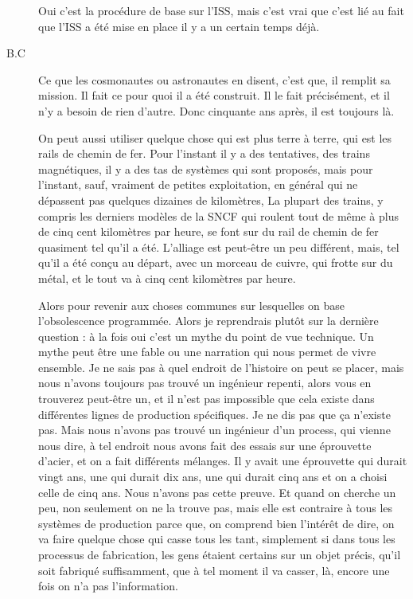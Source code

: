\begin{description}
Oui c'est la procédure de base sur l'ISS, mais c'est vrai que c'est lié au fait que l'ISS a été mise en place il y a un certain temps déjà.

\vspace{1\baselineskip}

\item[B.C]Ce que les cosmonautes ou astronautes en disent, c'est que, il remplit sa mission. Il fait ce pour quoi il a été construit. Il le fait précisément, et il n'y a besoin de rien d'autre. Donc cinquante ans après, il est toujours là. 

On peut aussi utiliser quelque chose qui est plus terre à terre, qui est les rails de chemin de fer. Pour l'instant il y a des tentatives, des trains magnétiques, il y a des tas de systèmes qui sont proposés, mais pour l'instant, sauf, vraiment de petites exploitation, en général qui ne dépassent pas quelques dizaines de kilomètres, La plupart des trains, y compris les derniers modèles de la SNCF qui roulent tout de même à plus de cinq cent kilomètres par heure, se font sur du rail de chemin de fer quasiment tel qu'il a été. L'alliage est peut-être un peu différent, mais, tel qu'il a été conçu au départ, avec un morceau de cuivre, qui frotte sur du métal, et le tout va à  cinq cent kilomètres par heure. 

Alors pour revenir aux choses communes sur lesquelles on base l'obsolescence programmée. Alors je reprendrais plutôt sur la dernière question : à la fois oui c'est un mythe du point de vue technique. Un mythe peut être une fable ou une narration qui nous permet de vivre ensemble. Je ne sais pas à quel endroit de l'histoire on peut se placer, mais nous n'avons toujours pas trouvé un ingénieur repenti, alors vous en trouverez peut-être un, et il n'est pas impossible que cela existe dans différentes lignes de production spécifiques. Je ne dis pas que ça n'existe pas. Mais nous n'avons pas trouvé un ingénieur d'un process, qui vienne nous dire, à tel endroit nous avons fait des essais sur une éprouvette d'acier, et on a fait différents mélanges. Il y avait une éprouvette qui durait vingt ans, une qui durait dix ans, une qui durait cinq ans et on a choisi celle de cinq ans. Nous n'avons pas cette  preuve. Et quand on cherche un peu, non seulement on ne la trouve pas, mais elle est contraire à tous les systèmes de production parce que, on comprend bien l’intérêt de dire, on va faire quelque chose qui casse tous les tant, simplement si dans tous les processus de fabrication, les gens étaient certains sur un objet précis, qu'il soit fabriqué suffisamment, que à tel moment il va casser, là, encore une fois on n'a pas l'information.


\end{description}
